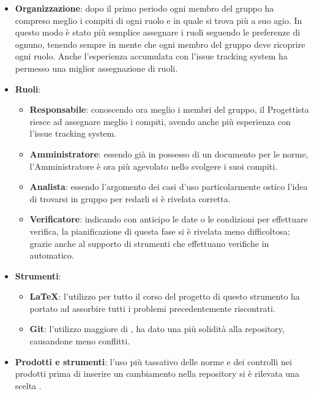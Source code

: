     \begin{itemize}
        \item \textbf{Organizzazione}: dopo il primo periodo ogni membro del gruppo ha compreso meglio i compiti di ogni ruolo e in quale si trova più a suo agio. In questo modo è stato più semplice assegnare i ruoli seguendo le preferenze di ognuno, tenendo sempre in mente che ogni membro del gruppo deve ricoprire ogni ruolo. Anche l'esperienza accumulata con l'issue tracking system ha permesso una miglior assegnazione di ruoli.
        \item \textbf{Ruoli}:
            \begin{itemize}
                \item \textbf{Responsabile}: conoscendo ora meglio i membri del gruppo, il Progettista riesce ad assegnare meglio i compiti, avendo anche più esperienza con l'issue tracking system.
                \item \textbf{Amministratore}: essendo già in possesso di un documento per le norme, l'Amministratore è ora più agevolato nello svolgere i suoi compiti.
                \item \textbf{Analista}: essendo l'argomento dei casi d'uso particolarmente ostico l'idea di trovarsi in gruppo per redarli si è rivelata corretta.
                \item \textbf{Verificatore}: indicando con anticipo le date o le condizioni per effettuare verifica, la pianificazione di questa fase si è rivelata meno difficoltosa; grazie anche al supporto di strumenti che effettuano verifiche in automatico.
            \end{itemize}
        \item \textbf{Strumenti}:
            \begin{itemize}
                \item \textbf{\LaTeX}: l'utilizzo per tutto il corso del progetto di questo strumento ha portato ad assorbire tutti i problemi precedentemente riscontrati.
                \item \textbf{Git}: l'utilizzo maggiore di , ha dato una più solidità alla repository, causandone meno conflitti.
            \end{itemize}
        \item \textbf{Prodotti e strumenti}: l'uso più tassativo delle norme e dei controlli nei prodotti prima di inserire un cambiamento nella repository si è rilevata una scelta .
    \end{itemize}
    
